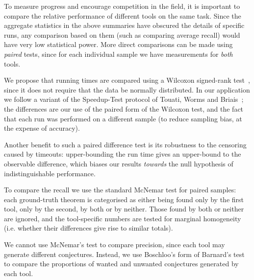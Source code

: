 To measure progress and encourage competition in the field, it is important to
compare the relative performance of different tools on the same task. Since the
aggregate statistics in the above summaries have obscured the details of
specific runs, any comparison based on them (such as comparing average recall)
would have very low statistical power. More direct comparisons can be made using
\emph{paired} tests, since for each individual sample we have measurements for
\emph{both} tools.

We propose that running times are compared using a Wilcoxon signed-rank
test~\cite{wilcoxon1945individual}, since it does not require that the data be
normally distributed. In our application we follow a variant of the Speedup-Test
protocol of Touati, Worms and Briais~\cite{touati2013speedup}; the differences
are our use of the paired form of the Wilcoxon test, and the fact that each run
was performed on a different sample (to reduce sampling bias, at the expense of
accuracy).

Another benefit to such a paired difference test is its robustness to the
censoring caused by timeouts: upper-bounding the run time gives an upper-bound
to the observable difference, which biases our results \emph{towards} the null
hypothesis of indistinguishable performance.

To compare the recall we use the standard McNemar test for paired samples: each
ground-truth theorem is categorised as either being found only by the first
tool, only by the second, by both or by neither. Those found by both or neither
are ignored, and the tool-specific numbers are tested for marginal homogeneity
(i.e. whether their differences give rise to similar totals).

We cannot use McNemar's test to compare precision, since each tool may generate
different conjectures. Instead, we use Boschloo's form of Barnard's test to
compare the proportions of wanted and unwanted conjectures generated by each
tool.

